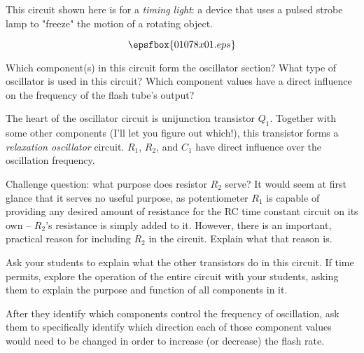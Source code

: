 

This circuit shown here is for a {\it timing light}: a device that uses a pulsed strobe lamp to "freeze" the motion of a rotating object.

$$\epsfbox{01078x01.eps}$$

Which component(s) in this circuit form the oscillator section?  What type of oscillator is used in this circuit?  Which component values have a direct influence on the frequency of the flash tube's output?







The heart of the oscillator circuit is unijunction transistor $Q_1$.  Together with some other components (I'll let you figure out which!), this transistor forms a {\it relaxation oscillator} circuit.  $R_1$, $R_2$, and $C_1$ have direct influence over the oscillation frequency.

\vskip 10pt

Challenge question: what purpose does resistor $R_2$ serve?  It would seem at first glance that it serves no useful purpose, as potentiometer $R_1$ is capable of providing any desired amount of resistance for the RC time constant circuit on its own -- $R_2$'s resistance is simply added to it.  However, there is an important, practical reason for including $R_2$ in the circuit.  Explain what that reason is.







Ask your students to explain what the other transistors do in this circuit.  If time permits, explore the operation of the entire circuit with your students, asking them to explain the purpose and function of all components in it.

After they identify which components control the frequency of oscillation, ask them to specifically identify which direction each of those component values would need to be changed in order to increase (or decrease) the flash rate.




